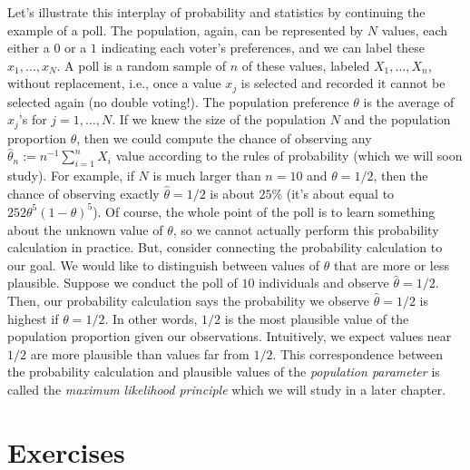 \documentclass[
]{book}
\begin{document}
Let's illustrate this interplay of probability and statistics by continuing the example of a poll. The population, again, can be represented by \(N\) values, each either a \(0\) or a \(1\) indicating each voter's preferences, and we can label these \(x_1, \ldots, x_N\). A poll is a random sample of \(n\) of these values, labeled \(X_1, \ldots,X_n\), without replacement, i.e., once a value \(x_j\) is selected and recorded it cannot be selected again (no double voting!). The population preference \(\theta\) is the average of \(x_j\)'s for \(j=1, \ldots, N\). If we knew the size of the population \(N\) and the population proportion \(\theta\), then we could compute the chance of observing any \(\hat\theta_n := n^{-1}\sum_{i=1}^n X_i\) value according to the rules of probability (which we will soon study). For example, if \(N\) is much larger than \(n = 10\) and \(\theta = 1/2\), then the chance of observing exactly \(\hat\theta = 1/2\) is about \(25\%\) (it's about equal to \(252\theta^5(1-\theta)^5\)). Of course, the whole point of the poll is to learn something about the unknown value of \(\theta\), so we cannot actually perform this probability calculation in practice. But, consider connecting the probability calculation to our goal. We would like to distinguish between values of \(\theta\) that are more or less plausible. Suppose we conduct the poll of \(10\) individuals and observe \(\hat\theta = 1/2\). Then, our probability calculation says the probability we observe \(\hat\theta = 1/2\) is highest if \(\theta = 1/2\). In other words, \(1/2\) is the most plausible value of the population proportion given our observations. Intuitively, we expect values near \(1/2\) are more plausible than values far from \(1/2\). This correspondence between the probability calculation and plausible values of the \emph{population parameter} is called the \emph{maximum likelihood principle} which we will study in a later chapter.

\hypertarget{exercises}{%
\section{Exercises}\label{exercises}}
\end{document}
